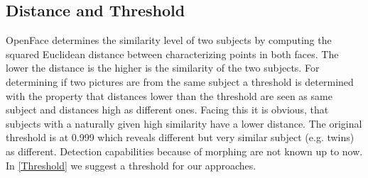 \subsection{Distance and Threshold}
OpenFace determines the similarity level of two subjects by computing the squared Euclidean distance between characterizing points in both faces. The lower the distance is the higher is the similarity of the two subjects. 
For determining if two pictures are from the same subject a threshold is determined with the property that distances lower than the threshold are seen as same subject and distances high as different ones. 
Facing this it is obvious, that subjects with a naturally given high similarity have a lower distance. The original threshold is at 0.999 which reveals different but very similar subject (e.g. twins) as different. Detection capabilities because of morphing are not known up to now.
In \autoref{Threshold} we suggest a threshold for our approaches. 

